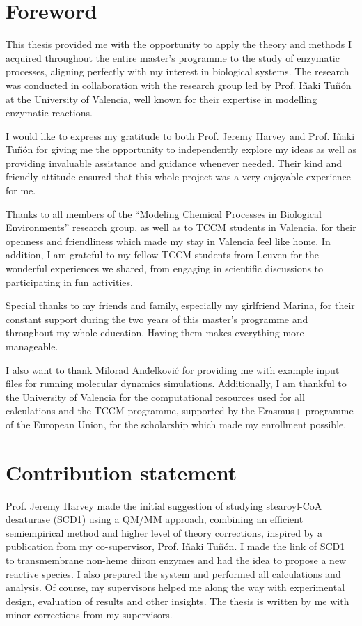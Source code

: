 \chapter*{Foreword}  
This thesis provided me with the opportunity to apply the theory and methods I acquired throughout the entire master's programme to the study of enzymatic processes, aligning perfectly with my interest in biological systems. The research was conducted in collaboration with the research group led by Prof. Iñaki Tuñón at the University of Valencia, well known for their expertise in modelling enzymatic reactions. 
\par\bigskip
\noindent I would like to express my gratitude to both Prof. Jeremy Harvey and Prof. Iñaki Tuñón for giving me the opportunity to independently explore my ideas as well as providing invaluable assistance and guidance whenever needed. Their kind and friendly attitude ensured that this whole project was a very enjoyable experience for me.
\par\bigskip
\noindent Thanks to all members of the ``Modeling Chemical Processes in Biological Environments'' research group, as well as to TCCM students in Valencia, for their openness and friendliness which made my stay in Valencia feel like home. In addition, I am grateful to my fellow TCCM students from Leuven for the wonderful experiences we shared, from engaging in scientific discussions to participating in fun activities.
\par\bigskip
\noindent Special thanks to my friends and family, especially my girlfriend Marina, for their constant support during the two years of this master's programme and throughout my whole education. Having them makes everything more manageable.
\par\bigskip
\noindent I also want to thank Milorad Anđelković for providing me with example input files for running molecular dynamics simulations. Additionally, I am thankful to the University of Valencia for the computational resources used for all calculations and the TCCM programme, supported by the Erasmus+ programme of the European Union, for the scholarship which made my enrollment possible.

\chapter*{Contribution statement}
Prof. Jeremy Harvey made the initial suggestion of studying stearoyl-CoA desaturase (SCD1) using a QM/MM approach, combining an efficient semiempirical method and higher level of theory corrections, inspired by a publication from my co-supervisor, Prof. Iñaki Tuñón. I made the link of SCD1 to transmembrane non-heme diiron enzymes and had the idea to propose a new reactive species. I also prepared the system and performed all calculations and analysis. Of course, my supervisors helped me along the way with experimental design, evaluation of results and other insights. The thesis is written by me with minor corrections from my supervisors.